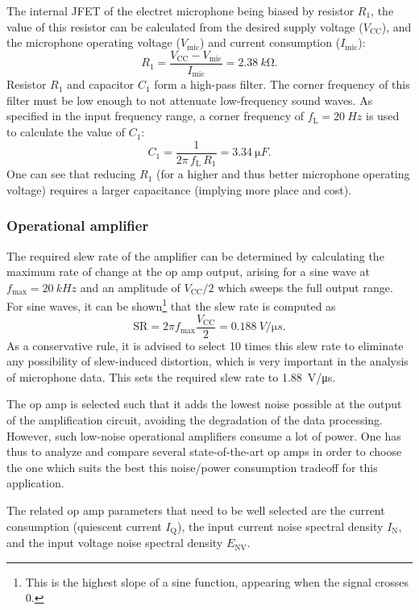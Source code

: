 \documentclass{EPL-master-thesis-covers-EN}
\newcommand{\te}[1]{\textrm{#1}}
\begin{document}
The internal JFET of the electret microphone being biased by resistor $R_1$, the value of this resistor can be calculated from the desired supply voltage ($V_\te{CC}$), and the microphone operating voltage ($V_\te{mic}$) and current consumption ($I_\te{mic}$):
\[
 R_1 = \frac{V_\te{CC} - V_\te{mic}}{I_\te{mic}} = \SI{2.38}{k\ohm}.
\]
Resistor $R_1$ and capacitor $C_1$ form a high-pass filter. The corner frequency of this filter must be low enough to not attenuate low-frequency sound waves. As specified in the input frequency range, a corner frequency of $f_\te{L} = \SI{20}{Hz}$ is used to calculate the value of $C_1$:
\[
 C_1 = \frac{1}{2 \pi \, f_\te{L} \, R_1} = \SI{3.34}{\micro F}.
\]
One can see that reducing $R_1$ (for a higher and thus better microphone operating voltage) requires a larger capacitance (implying more place and cost).

\subsubsection*{Operational amplifier}

The required slew rate of the amplifier can be determined by calculating the maximum rate of change at the op amp output, arising  for a sine wave at $f_\te{max} = \SI{20}{kHz}$ and an amplitude of $V_\te{CC}/2$ which sweeps the full output range. For sine waves, it can be shown\footnote{This is the highest slope of a sine function, appearing when the signal crosses 0.} that the slew rate is computed as
\[
 \te{SR} = 2 \pi f_\te{max} \frac{V_\te{CC}}{2} = \SI{0.188}{V/\micro s}.
\]
As a conservative rule, it is advised to select 10 times this slew rate to eliminate any possibility of slew-induced distortion, which is very important in the analysis of microphone data. This sets the required slew rate to \SI{1.88}{V/\micro s}.

The op amp is selected such that it adds the lowest noise possible at the output of the amplification circuit, avoiding the degradation of the data processing. However, such low-noise operational amplifiers consume a lot of power. One has thus to analyze and compare several state-of-the-art op amps in order to choose the one which suits the best this noise/power consumption tradeoff for this application.

The related op amp parameters that need to be well selected are the current consumption (quiescent current $I_\te{Q}$), the input current noise spectral density $I_\te{N}$, and the input voltage noise spectral density $E_\te{NV}$.
\end{document}
